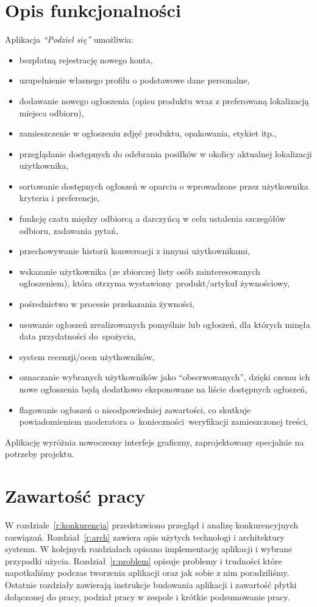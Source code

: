 \documentclass[licencjacka]{pracamgr}
\begin{document}
\section*{Opis funkcjonalności}
Aplikacja \textit{``Podziel się''} umożliwia:
\begin{itemize}
\setlength\itemsep{-0.2em}
\item bezpłatną rejestrację nowego konta,
\item uzupełnienie własnego profilu o podstawowe dane personalne,
\item dodawanie nowego ogłoszenia (opisu produktu wraz z preferowaną lokalizacją miejsca odbioru),
\item zamieszczenie w ogłoszeniu zdjęć produktu, opakowania, etykiet itp.,
\item przeglądanie dostępnych do odebrania posiłków w okolicy aktualnej lokalizacji użytkownika,
\item sortowanie dostępnych ogłoszeń w oparciu o wprowadzone przez użytkownika kryteria i preferencje,
\item funkcję czatu między odbiorcą a darczyńcą w celu ustalenia szczegółów odbioru, zadawania pytań,
\item przechowywanie historii konwersacji z innymi użytkownikami,
\item wskazanie użytkownika (ze zbiorczej listy osób zainteresowanych ogłoszeniem), która otrzyma wystawiony~produkt/artykuł żywnościowy,
\item pośrednictwo w procesie przekazania żywności,
\item usuwanie ogłoszeń zrealizowanych pomyślnie lub ogłoszeń, dla których minęła data przydatności do~spożycia,
\item system recenzji/ocen użytkowników,
\item oznaczanie wybranych użytkowników jako ``obserwowanych'', dzięki czemu ich nowe ogłoszenia będą dodatkowo eksponowane na liście dostępnych ogłoszeń,
\item flagowanie ogłoszeń o nieodpowiedniej zawartości, co skutkuje powiadomieniem moderatora o~konieczności~weryfikacji zamieszczonej treści,
\end{itemize}
Aplikację wyróżnia nowoczesny interfejs graficzny, zaprojektowany specjalnie na potrzeby projektu.

\section*{Zawartość pracy}
W rozdziale~\ref{r:konkurencja} przedstawiono przegląd i analizę konkurencyjnych rozwiązań. Rozdział~\ref{r:arch} zawiera opis użytych technologi i architektury systemu. W kolejnych rozdziałach opisano implementację aplikacji i wybrane przypadki użycia. Rozdział~\ref{r:problem} opisuje problemy i trudności które napotkaliśmy podczas tworzenia aplikacji oraz jak sobie z nim poradziliśmy. Ostatnie rozdziały zawierają instrukcje budowania aplikacji i zawartość płytki dołączonej do pracy, podział pracy w zespole i krótkie podsumowanie pracy.
\end{document}

